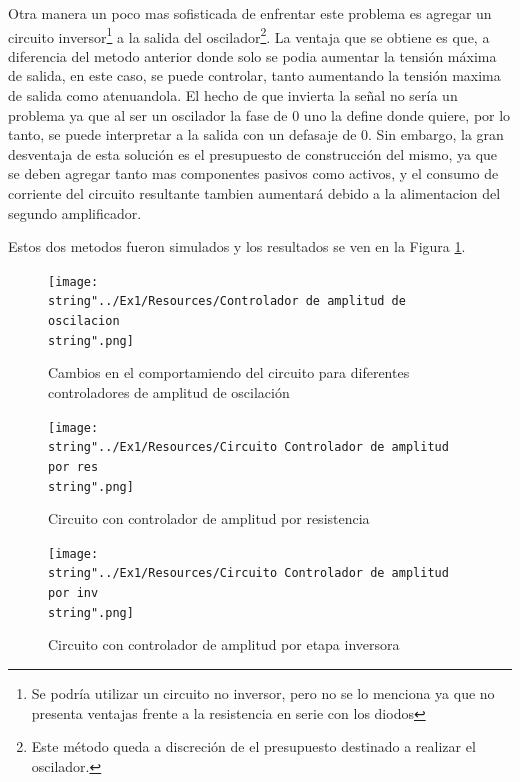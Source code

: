 Otra manera un poco mas sofisticada de enfrentar este problema es
agregar un circuito inversor\footnote{Se podría utilizar un circuito no inversor, pero no se lo menciona
ya que no presenta ventajas frente a la resistencia en serie con los
diodos} a la salida del oscilador\footnote{Este método queda a discreción de el presupuesto destinado a realizar
el oscilador.}. La ventaja que se obtiene es que, a diferencia del metodo anterior
donde solo se podia aumentar la tensión máxima de salida, en este
caso, se puede controlar, tanto aumentando la tensión maxima de salida
como atenuandola. El hecho de que invierta la señal no sería un problema
ya que al ser un oscilador la fase de 0\textdegree{} uno la define
donde quiere, por lo tanto, se puede interpretar a la salida con un
defasaje de 0\textdegree . Sin embargo, la gran desventaja de esta
solución es el presupuesto de construcción del mismo, ya que se deben
agregar tanto mas componentes pasivos como activos, y el consumo de
corriente del circuito resultante tambien aumentará debido a la alimentacion
del segundo amplificador. 

Estos dos metodos fueron simulados y los resultados se ven en la Figura
\ref{1_7}.

\begin{figure}[h]
\begin{centering}
\texttt{[image: \\string"../Ex1/Resources/Controlador de amplitud de oscilacion\\string".png]}
\par\end{centering}
\caption{Cambios en el comportamiendo del circuito para diferentes controladores
de amplitud de oscilación}
\label{1_7}

\end{figure}

\begin{figure}[h]
\begin{centering}
\texttt{[image: \\string"../Ex1/Resources/Circuito Controlador de amplitud por res\\string".png]}
\par\end{centering}
\caption{Circuito con controlador de amplitud por resistencia}

\end{figure}

\begin{figure}[h]
\begin{centering}
\texttt{[image: \\string"../Ex1/Resources/Circuito Controlador de amplitud por inv\\string".png]}
\par\end{centering}
\caption{Circuito con controlador de amplitud por etapa inversora}

\end{figure}

